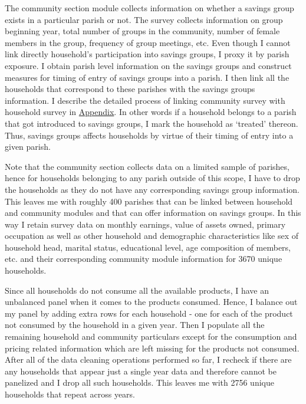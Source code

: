 \documentclass[12pt]{article}
\begin{document}
{\hspace{1cm} The community section module collects information on whether a savings group exists in a particular parish or not. The survey collects information on group beginning year, total number of groups in the community, number of female members in the group, frequency of group meetings, etc. Even though I cannot link directly household's participation into savings groups, I proxy it by parish exposure. I obtain parish level information on the savings groups and construct measures for timing of entry of savings groups into a parish. I then link all the households that correspond to these parishes with the savings groups information. I describe the detailed process of linking community survey with household survey in \hyperref[sec:appendix]{Appendix}. In other words if a household belongs to a parish that got introduced to savings groups, I mark the household as `treated' thereon. Thus, savings groups affects households by virtue of their timing of entry into a given parish.

\hspace{1cm} Note that the community section collects data on a limited sample of parishes, hence for households belonging to any parish outside of this scope, I have to drop the households as they do not have any corresponding savings group information. This leaves me with roughly 400 parishes that can be linked between household and community modules and that can offer information on savings groups. In this way I retain survey data on monthly earnings, value of assets owned, primary occupation as well as other household and demographic characteristics like sex of household head, marital status, educational level, age composition of members, etc. and their corresponding community module information for 3670 unique households. 

\hspace{1cm} Since all households do not consume all the available products, I have an unbalanced panel when it comes to the products consumed. Hence, I balance out my panel by adding extra rows for each household - one for each of the product not consumed by the household in a given year. Then I populate all the remaining household and community particulars except for the consumption and pricing related information which are left missing for the products not consumed. After all of the data cleaning operations performed so far, I recheck if there are any households that appear just a single year data and therefore cannot be panelized and I drop all such households. This leaves me with 2756 unique households that repeat across years. 

}
\end{document}
